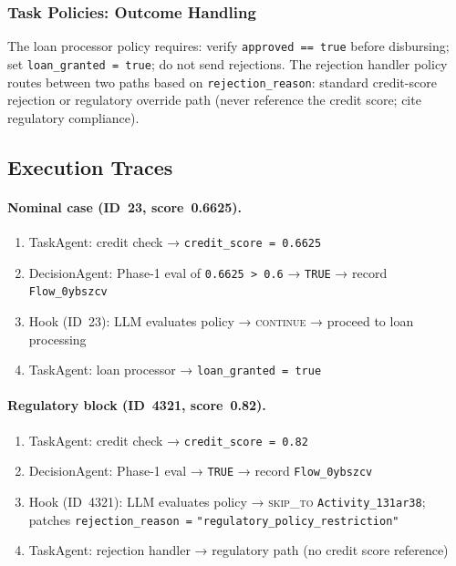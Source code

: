 \documentclass[11pt,a4paper]{article}
\begin{document}
\subsubsection{Task Policies: Outcome Handling}

\begin{sloppypar}
The loan processor policy requires: verify \texttt{approved == true}
before disbursing; set \texttt{loan\_granted = true}; do not send rejections.
The rejection handler policy routes between two paths based on
\texttt{rejection\_reason}: standard credit-score rejection or regulatory
override path (never reference the credit score; cite regulatory compliance).
\end{sloppypar}

\subsection{Execution Traces}

\paragraph{Nominal case (ID~23, score~0.6625).}
\begin{enumerate}[noitemsep, label=\arabic*.]
  \item TaskAgent: credit check → \texttt{credit\_score = 0.6625}
  \item DecisionAgent: Phase-1 eval of \texttt{0.6625 > 0.6} → \texttt{TRUE}
        → record \texttt{Flow\_0ybszcv}
  \item Hook (ID~23): LLM evaluates policy → \textsc{continue} → proceed to
        loan processing
  \item TaskAgent: loan processor → \texttt{loan\_granted = true}
\end{enumerate}

\paragraph{Regulatory block (ID~4321, score~0.82).}
\begin{enumerate}[noitemsep, label=\arabic*.]
  \item TaskAgent: credit check → \texttt{credit\_score = 0.82}
  \item DecisionAgent: Phase-1 eval → \texttt{TRUE} → record \texttt{Flow\_0ybszcv}
  \item Hook (ID~4321): LLM evaluates policy → \textsc{skip\_to}
        \texttt{Activity\_131ar38};\\
        patches \texttt{rejection\_reason =}
        \texttt{"regulatory\_policy\_restriction"}
  \item TaskAgent: rejection handler → regulatory path (no credit score reference)
\end{enumerate}
\end{document}
